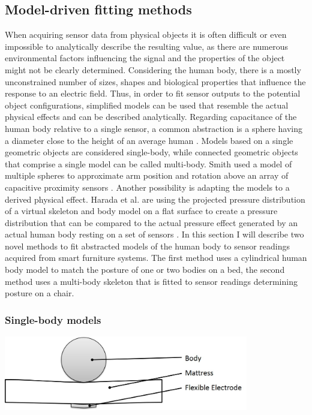 \subsection{Model-driven fitting methods}
\label{ch:proc_model}
When acquiring sensor data from physical objects it is often difficult or even impossible to analytically describe the resulting value, as there are numerous environmental factors influencing the signal and the properties of the object might not be clearly determined. Considering the human body, there is a mostly unconstrained number of sizes, shapes and biological properties that influence the response to an electric field. Thus, in order to fit sensor outputs to the potential object configurations, simplified models can be used that resemble the actual physical effects and can be described analytically. Regarding capacitance of the human body relative to a single sensor, a common abstraction is a sphere having a diameter close to the height of an average human \cite{seaver1997human}. Models based on a single geometric objects are considered single-body, while connected geometric objects that comprise a single model can be called multi-body. Smith used a model of multiple spheres to approximate arm position and rotation above an array of capacitive proximity sensors \cite{smith1998electric}. Another possibility is adapting the models to a derived physical effect. Harada et al. are using the projected pressure distribution of a virtual skeleton and body model on a flat surface to create a pressure distribution that can be compared to the actual pressure effect generated by an actual human body resting on a set of sensors \cite{harada2000human}. In this section I will describe two novel methods to fit abstracted models of the human body to sensor readings acquired from smart furniture systems. The first method uses a cylindrical human body model to match the posture of one or two bodies on a bed, the second method uses a multi-body skeleton that is fitted to sensor readings determining posture on a chair.
\subsubsection{Single-body models}
\begin{minipage}{\linewidth}
\centering
\includegraphics[width=0.8\textwidth]{images/proc_hetero_flexpressure}
\label{fig:proc_hetero_flexpressure}
\end{minipage}

